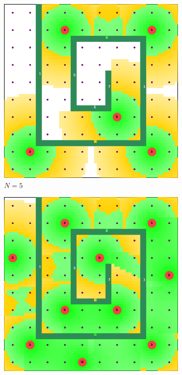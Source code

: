 \documentclass[conference]{IEEEtran}
\begin{document}
\begin{figure}[t]
\begin{subfigure}[t]{0.10\textwidth}
        \includegraphics[width=\textwidth]{Figures/Maze4_1.png}
        \caption{$N=5$}
    \end{subfigure}\hfill
    \begin{subfigure}[t]{0.10\textwidth}
        \centering
        \includegraphics[width=\textwidth]{Figures/Maze4_2.png}

\end{subfigure}
\end{figure}
\end{document}
